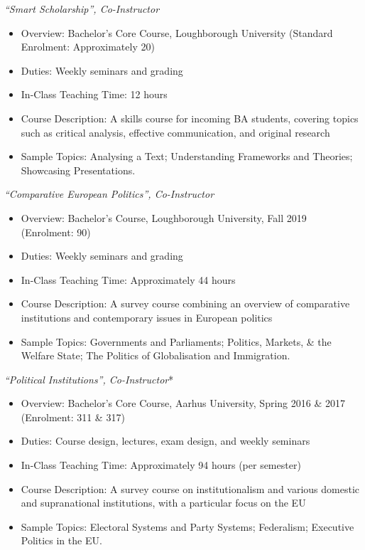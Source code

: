 \documentclass[11pt]{article}
\begin{document}
		  \textit{“Smart Scholarship”, Co-Instructor}
	\begin{itemize}[itemsep=0em, topsep=0em, partopsep=0em]
		\kern-\parskip\item Overview: Bachelor’s Core Course, Loughborough University (Standard Enrolment: Approximately 20)
		\item Duties: Weekly seminars and grading
		\item In-Class Teaching Time: 12 hours
		\item Course Description: A skills course for incoming BA students, covering topics such as critical analysis, effective communication, and original research
		\item Sample Topics: Analysing a Text; Understanding Frameworks and Theories; Showcasing Presentations.
	\end{itemize}
	\textit{“Comparative European Politics”, Co-Instructor}
	      \begin{itemize}[itemsep=0em, topsep=0em, partopsep=0em]
	      	\kern-\parskip\item Overview: Bachelor’s Course, Loughborough University, Fall 2019 (Enrolment: {\selectfont\texttildelow} 90)
	      	\item Duties: Weekly seminars and grading
	      	\item In-Class Teaching Time: Approximately 44 hours 
	      	\item Course Description: A survey course combining an overview of comparative institutions and contemporary issues in European politics 
	      	\item Sample Topics: Governments and Parliaments; Politics, Markets, \& the Welfare State; The Politics of Globalisation and Immigration.
	      \end{itemize}
	\textit{“Political Institutions”, Co-Instructor}*
	      \begin{itemize}[itemsep=0em, topsep=0em, partopsep=0em]
	      	\kern-\parskip\item Overview: Bachelor’s Core Course, Aarhus University, Spring 2016 \& 2017 (Enrolment: 311 \& 317)
	      	\item Duties: Course design, lectures, exam design, and weekly seminars
	      	\item In-Class Teaching Time: Approximately 94 hours (per semester)
	      	\item Course Description: A survey course on institutionalism and various domestic and supranational institutions, with a particular focus on the EU
	      	\item Sample Topics: Electoral Systems and Party Systems; Federalism; Executive Politics in the EU.
	      \end{itemize}
\end{document}
